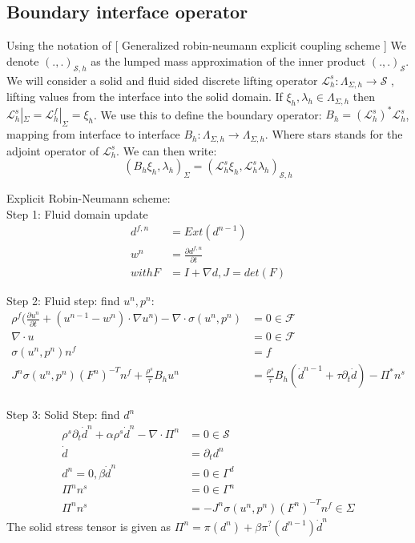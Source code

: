 \subsection*{Boundary interface operator}
Using the notation of [ Generalized robin-neumann explicit coupling scheme ]
We denote $(.,.)_{\mathcal{S},h}$ as the lumped mass approximation of the inner product $(.,.)_{\mathcal{S}}$. We will consider a solid and fluid sided discrete lifting operator $ \mathcal{L}_h^s: \Lambda_{\Sigma, h} \rightarrow \mathcal{S} $ , lifting values from the interface into the solid domain. If $ \xi_h, \lambda_h \in \Lambda_{\Sigma, h}  $ then $\mathcal{L}_h^s |_\Sigma = \mathcal{L}_h^f |_\Sigma = \xi_h  $. We use this to define the boundary operator: $ B_h =(\mathcal{L}_h^s)^* \mathcal{L}_h^s  $, mapping from interface to interface $ B_h : \Lambda_{\Sigma, h} \rightarrow \Lambda_{\Sigma, h}  $.  Where stars stands for the adjoint operator of $ \mathcal{L}_h^s $. We can then write:
$$   ( B_h \xi_h , \lambda_h )_\Sigma = (\mathcal{L}_h^s \xi_h ,\mathcal{L}_h^s \lambda_h)_{\mathcal{S},h} $$


\newpage
Explicit Robin-Neumann scheme: \\
Step 1:
Fluid domain update
\begin{align*}
d^{f,n} &= Ext(d^{n-1}) \\
w^n &= \frac{\partial d^{f,n}}{\partial t} \\
with F &= I + \nabla d, J= det(F)
\end{align*}

Step 2:
Fluid step: find $u^n, p^n$:
\begin{align*}
\rho^f \big( \frac{\partial u^{n}}{\partial t} + ( u^{n-1} - w^n ) \cdot \nabla u^n \big) - \nabla \cdot \sigma(u^n,p^n) &= 0  \in  \mathcal{F} \\
\nabla \cdot u &= 0  \in \mathcal{F} \\
\sigma(u^n, p^n) n^f &= f \\
J^n \sigma(u^n, p^n)(F^n)^{-T}n^f + \frac{\rho^s}{\tau} B_h u^n &= \frac{\rho^s}{\tau} B_h (\dot{d}^{n-1} + \tau \partial_t \dot{d}  ) - \Pi^{*} n^s \\
\end{align*}

Step 3:
Solid Step: find $d^n$
\begin{align*}
\rho^s \partial_t \dot{d}^n + \alpha \rho^s \dot{d}^n - \nabla \cdot \Pi^n &= 0 \in \mathcal{S} \\
\dot{d} &= \partial_t d^n \\
d^n = 0, \beta \dot{d}^n &= 0 \in \Gamma^d  \\
\Pi^n n^s &= 0 \in \Gamma^n \\
\Pi^n n^s &= -J^n \sigma(u^n, p^n) (F^n)^{-T}n^f \in \Sigma 
\end{align*}
The solid stress tensor is given as $ \Pi^n = \pi(d^n) + \beta \pi^{?}(d^{n-1}) \dot{d}^n $
